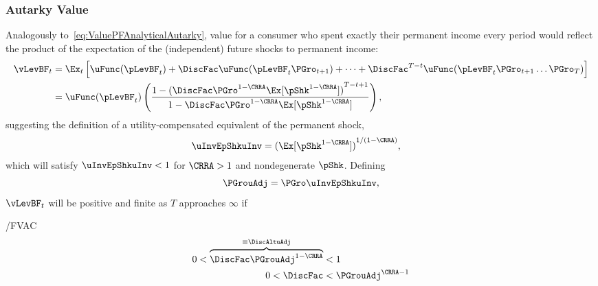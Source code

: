 \documentclass[BufferStockTheory]{subfiles}
\begin{document}
\subsubsection{Autarky Value}
Analogously to~\eqref{eq:ValuePFAnalyticalAutarky}, value for a consumer who spent exactly their permanent income every period would reflect the product of the expectation of the (independent) future shocks to permanent income:\hypertarget{uInvEpShkuInv}{}
\begin{align*}
  \vLevBF_{t}  & = \Ex_{t}\left[\uFunc(\pLevBF_{t}) + \DiscFac \uFunc(\pLevBF_{t}\PGro_{t+1}) + \cdots + \DiscFac^{T-t}\uFunc(\pLevBF_{t}\PGro_{t+1}\ldots\PGro_{T})\right] \\
               & = \uFunc(\pLevBF_{t})\left(\frac{1-{(\DiscFac \PGro^{1-\CRRA}\Ex[\pShk^{1-\CRRA}])}^{T-t+1}}{1-\DiscFac \PGro^{1-\CRRA} \Ex[\pShk^{1-\CRRA}]}\right),
\end{align*}
suggesting the definition of a utility-compensated equivalent of the permanent shock,\hypertarget{PermGrouAdj}{}
\begin{align}
  \uInvEpShkuInv  & = {(\Ex[\pShk^{1-\CRRA}])}^{1/(1-\CRRA)} \label{eq:uInvEpShkuInv},
\end{align}
which will satisfy $\uInvEpShkuInv < 1$ for $\CRRA>1$ and nondegenerate $\pShk$.%
\hypertarget{DiscAltuAdj}{} Defining
\begin{equation}
  \label{eq:PGrouAdj}
  \PGrouAdj = \PGro \uInvEpShkuInv,
\end{equation}
$\vLevBF_{t}$ will be positive and finite as $T$ approaches $\infty$ if\hypertarget{FVAC}{}
\begin{verbatimwrite}{\EqDir/FVAC}
  \begin{align}
    0 < \overbrace{\DiscFac \PGrouAdj^{1-\CRRA} }^{\equiv \DiscAltuAdj}  & < 1 \notag
    \\ 0 < \DiscFac  & < \PGrouAdj^{\CRRA-1} \label{eq:FVAC}
  \end{align}
\end{verbatimwrite}
{}
\end{document}

